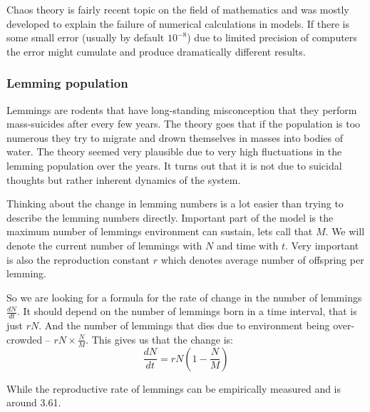\documentclass[pdftex, 12pt, a4paper]{report}
\begin{document}
	Chaos theory is fairly recent topic on the field of mathematics and was mostly developed to explain the failure of numerical calculations in models. If there is some small error (usually by default $10^{-8}$) due to limited precision of computers the error might cumulate and produce dramatically different results. 
	
	\subsubsection{Lemming population}
	
	Lemmings are rodents that have long-standing misconception that they perform mass-suicides after every few years. The theory goes that if the population is too numerous they try to migrate and drown themselves in masses into bodies of water. The theory seemed very plausible due to very high fluctuations in the lemming population over the years. It turns out that it is not due to suicidal thoughts but rather inherent dynamics of the system. \par
	
	Thinking about the change in lemming numbers is a lot easier than trying to describe the lemming numbers directly. Important part of the model is the maximum number of lemmings environment can sustain, lets call that $M$. We will denote the current number of lemmings with $N$ and time with $t$. Very important is also the reproduction constant $r$ which denotes average number of offspring per lemming. \par
	
	So we are looking for a formula for the rate of change in the number of lemmings $\frac{dN}{dt}$. It should depend on the number of lemmings born in a time interval, that is just $rN$. And the number of lemmings that dies due to environment being over-crowded -- $rN\times\frac{N}{M}$. This gives us that the change is: $$\frac{dN}{dt} = rN(1 - \frac{N}{M})$$
	
	While the reproductive rate of lemmings can be empirically measured and is around 3.61.
	
\end{document}
